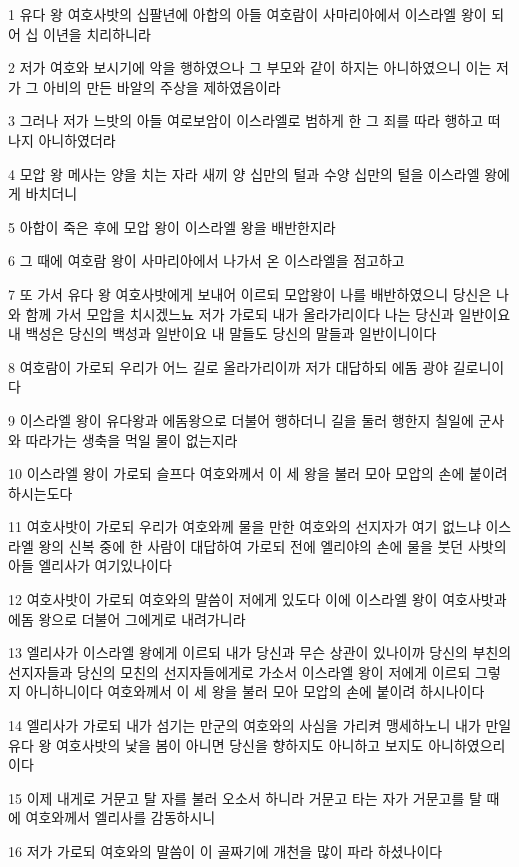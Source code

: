 \par 1 유다 왕 여호사밧의 십팔년에 아합의 아들 여호람이 사마리아에서 이스라엘 왕이 되어 십 이년을 치리하니라
\par 2 저가 여호와 보시기에 악을 행하였으나 그 부모와 같이 하지는 아니하였으니 이는 저가 그 아비의 만든 바알의 주상을 제하였음이라
\par 3 그러나 저가 느밧의 아들 여로보암이 이스라엘로 범하게 한 그 죄를 따라 행하고 떠나지 아니하였더라
\par 4 모압 왕 메사는 양을 치는 자라 새끼 양 십만의 털과 수양 십만의 털을 이스라엘 왕에게 바치더니
\par 5 아합이 죽은 후에 모압 왕이 이스라엘 왕을 배반한지라
\par 6 그 때에 여호람 왕이 사마리아에서 나가서 온 이스라엘을 점고하고
\par 7 또 가서 유다 왕 여호사밧에게 보내어 이르되 모압왕이 나를 배반하였으니 당신은 나와 함께 가서 모압을 치시겠느뇨 저가 가로되 내가 올라가리이다 나는 당신과 일반이요 내 백성은 당신의 백성과 일반이요 내 말들도 당신의 말들과 일반이니이다
\par 8 여호람이 가로되 우리가 어느 길로 올라가리이까 저가 대답하되 에돔 광야 길로니이다
\par 9 이스라엘 왕이 유다왕과 에돔왕으로 더불어 행하더니 길을 둘러 행한지 칠일에 군사와 따라가는 생축을 먹일 물이 없는지라
\par 10 이스라엘 왕이 가로되 슬프다 여호와께서 이 세 왕을 불러 모아 모압의 손에 붙이려 하시는도다
\par 11 여호사밧이 가로되 우리가 여호와께 물을 만한 여호와의 선지자가 여기 없느냐 이스라엘 왕의 신복 중에 한 사람이 대답하여 가로되 전에 엘리야의 손에 물을 붓던 사밧의 아들 엘리사가 여기있나이다
\par 12 여호사밧이 가로되 여호와의 말씀이 저에게 있도다 이에 이스라엘 왕이 여호사밧과 에돔 왕으로 더불어 그에게로 내려가니라
\par 13 엘리사가 이스라엘 왕에게 이르되 내가 당신과 무슨 상관이 있나이까 당신의 부친의 선지자들과 당신의 모친의 선지자들에게로 가소서 이스라엘 왕이 저에게 이르되 그렇지 아니하니이다 여호와께서 이 세 왕을 불러 모아 모압의 손에 붙이려 하시나이다
\par 14 엘리사가 가로되 내가 섬기는 만군의 여호와의 사심을 가리켜 맹세하노니 내가 만일 유다 왕 여호사밧의 낯을 봄이 아니면 당신을 향하지도 아니하고 보지도 아니하였으리이다
\par 15 이제 내게로 거문고 탈 자를 불러 오소서 하니라 거문고 타는 자가 거문고를 탈 때에 여호와께서 엘리사를 감동하시니
\par 16 저가 가로되 여호와의 말씀이 이 골짜기에 개천을 많이 파라 하셨나이다
